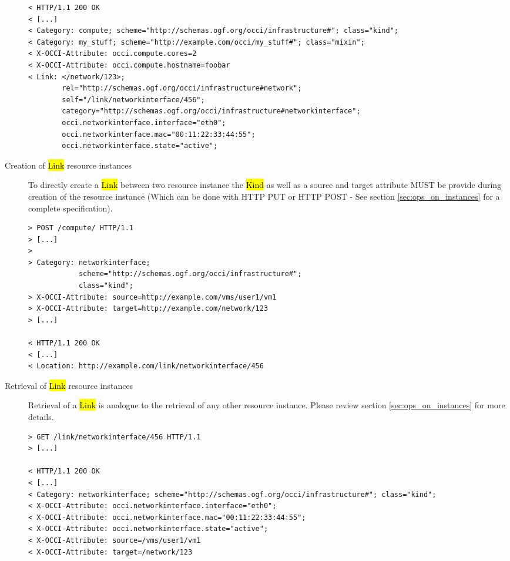 \documentclass[10pt,a4paper]{article}
\begin{document}
\begin{description}
\begin{verbatim}
< HTTP/1.1 200 OK
< [...]
< Category: compute; scheme="http://schemas.ogf.org/occi/infrastructure#"; class="kind";
< Category: my_stuff; scheme="http://example.com/occi/my_stuff#"; class="mixin";
< X-OCCI-Attribute: occi.compute.cores=2
< X-OCCI-Attribute: occi.compute.hostname=foobar
< Link: </network/123>;
        rel="http://schemas.ogf.org/occi/infrastructure#network";
        self="/link/networkinterface/456";
        category="http://schemas.ogf.org/occi/infrastructure#networkinterface";
        occi.networkinterface.interface="eth0";
        occi.networkinterface.mac="00:11:22:33:44:55";
        occi.networkinterface.state="active";
\end{verbatim}

\item[Creation of \hl{Link} resource instances] To directly create a
  \hl{Link} between two resource instance the \hl{Kind} as well as a
  source and target attribute MUST be provide during creation of the
  resource instance (Which can be done with HTTP PUT or HTTP POST -
  See section \ref{sec:ops_on_instances} for a complete
  specification).
\begin{verbatim}
> POST /compute/ HTTP/1.1
> [...]
> 
> Category: networkinterface; 
            scheme="http://schemas.ogf.org/occi/infrastructure#"; 
            class="kind"; 
> X-OCCI-Attribute: source=http://example.com/vms/user1/vm1
> X-OCCI-Attribute: target=http://example.com/network/123
> [...]
 
< HTTP/1.1 200 OK
< [...]
< Location: http://example.com/link/networkinterface/456
\end{verbatim}

\item[Retrieval of \hl{Link} resource instances] Retrieval of a
  \hl{Link} is analogue to the retrieval of any other resource
  instance. Please review section \ref{sec:ops_on_instances} for more
  details.
\begin{verbatim}
> GET /link/networkinterface/456 HTTP/1.1
> [...]

< HTTP/1.1 200 OK
< [...]
< Category: networkinterface; scheme="http://schemas.ogf.org/occi/infrastructure#"; class="kind";
< X-OCCI-Attribute: occi.networkinterface.interface="eth0";
< X-OCCI-Attribute: occi.networkinterface.mac="00:11:22:33:44:55";
< X-OCCI-Attribute: occi.networkinterface.state="active";
< X-OCCI-Attribute: source=/vms/user1/vm1
< X-OCCI-Attribute: target=/network/123
\end{verbatim}
\end{description}
\end{document}
